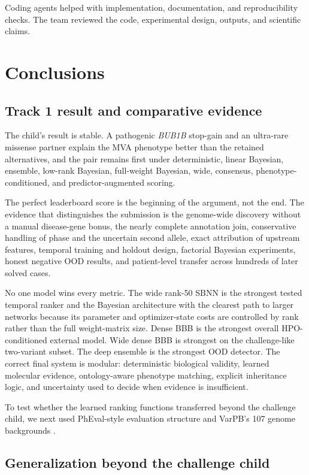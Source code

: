 \documentclass[11pt]{article}
\begin{document}
Coding agents helped with implementation, documentation, and reproducibility checks. The team reviewed the code, experimental design, outputs, and scientific claims.

\section{Conclusions}

\subsection{Track 1 result and comparative evidence}

The child's result is stable. A pathogenic \textit{BUB1B} stop-gain and an ultra-rare missense partner explain the MVA phenotype better than the retained alternatives, and the pair remains first under deterministic, linear Bayesian, ensemble, low-rank Bayesian, full-weight Bayesian, wide, consensus, phenotype-conditioned, and predictor-augmented scoring.

The perfect leaderboard score is the beginning of the argument, not the end. The evidence that distinguishes the submission is the genome-wide discovery without a manual disease-gene bonus, the nearly complete annotation join, conservative handling of phase and the uncertain second allele, exact attribution of upstream features, temporal training and holdout design, factorial Bayesian experiments, honest negative OOD results, and patient-level transfer across hundreds of later solved cases.

No one model wins every metric. The wide rank-50 SBNN is the strongest tested temporal ranker and the Bayesian architecture with the clearest path to larger networks because its parameter and optimizer-state costs are controlled by rank rather than the full weight-matrix size. Dense BBB is the strongest overall HPO-conditioned external model. Wide dense BBB is strongest on the challenge-like two-variant subset. The deep ensemble is the strongest OOD detector. The correct final system is modular: deterministic biological validity, learned molecular evidence, ontology-aware phenotype matching, explicit inheritance logic, and uncertainty used to decide when evidence is insufficient.

To test whether the learned ranking functions transferred beyond the challenge child, we next used PhEval-style evaluation structure and VarPB's 107 genome backgrounds \citep{pheval2025,varpb2023}.

\subsection{Generalization beyond the challenge child}
\end{document}
